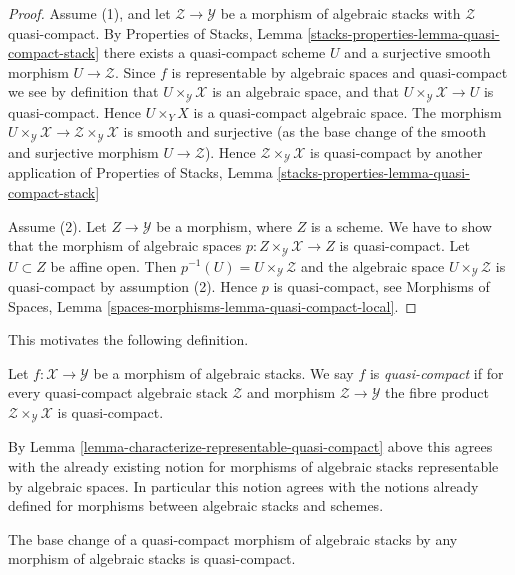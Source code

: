 \begin{proof}
Assume (1), and let $\mathcal{Z} \to \mathcal{Y}$
be a morphism of algebraic stacks with $\mathcal{Z}$ quasi-compact. By
Properties of Stacks,
Lemma \ref{stacks-properties-lemma-quasi-compact-stack}
there exists a quasi-compact scheme $U$ and a surjective smooth
morphism $U \to \mathcal{Z}$. Since $f$ is representable by algebraic
spaces and quasi-compact we see by definition that
$U \times_\mathcal{Y} \mathcal{X}$ is an algebraic space, and that
$U \times_\mathcal{Y} \mathcal{X} \to U$ is quasi-compact.
Hence $U \times_Y X$ is a quasi-compact algebraic space.
The morphism
$U \times_\mathcal{Y} \mathcal{X} \to
\mathcal{Z} \times_\mathcal{Y} \mathcal{X}$
is smooth and surjective (as the base change of the smooth
and surjective morphism $U \to \mathcal{Z}$).
Hence $\mathcal{Z} \times_\mathcal{Y} \mathcal{X}$
is quasi-compact by another application of
Properties of Stacks,
Lemma \ref{stacks-properties-lemma-quasi-compact-stack}

\medskip\noindent
Assume (2). Let $Z \to \mathcal{Y}$ be a morphism, where $Z$ is a scheme.
We have to show that the morphism of algebraic spaces
$p : Z \times_\mathcal{Y} \mathcal{X} \to Z$ is quasi-compact.
Let $U \subset Z$ be affine open. Then
$p^{-1}(U) = U \times_\mathcal{Y} \mathcal{Z}$
and the algebraic space $U \times_\mathcal{Y} \mathcal{Z}$
is quasi-compact by assumption (2). Hence $p$ is quasi-compact, see
Morphisms of Spaces, Lemma \ref{spaces-morphisms-lemma-quasi-compact-local}.
\end{proof}

\noindent
This motivates the following definition.

\begin{definition}
\label{definition-quasi-compact}
Let $f : \mathcal{X} \to \mathcal{Y}$ be a morphism of algebraic stacks.
We say $f$ is {\it quasi-compact} if for every quasi-compact
algebraic stack $\mathcal{Z}$ and morphism $\mathcal{Z} \to \mathcal{Y}$
the fibre product $\mathcal{Z} \times_\mathcal{Y} \mathcal{X}$
is quasi-compact.
\end{definition}

\noindent
By
Lemma \ref{lemma-characterize-representable-quasi-compact}
above this agrees with the already existing notion
for morphisms of algebraic stacks representable by algebraic spaces.
In particular this notion agrees with the notions already defined
for morphisms between algebraic stacks and schemes.

\begin{lemma}
\label{lemma-base-change-quasi-compact}
The base change of a quasi-compact morphism of algebraic stacks
by any morphism of algebraic stacks is quasi-compact.
\end{lemma}

